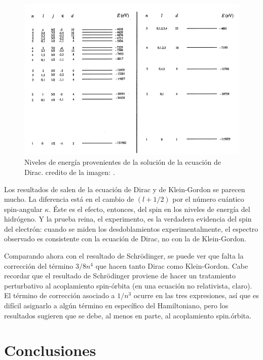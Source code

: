 \documentclass[a4paper, 12pt]{article} %
\begin{document}
\begin{figure}[H]
\centering
\includegraphics[scale=0.5]{relativistic.png}
\caption{Niveles de energ\'ia provenientes de la soluci\'on de la ecuaci\'on de Dirac.
credito de la imagen: \cite{strange}.}
\label{fig:relativistic}
\end{figure}

Los resultados de salen de la ecuaci\'on de Dirac y de Klein-Gordon se parecen mucho. La diferencia est\'a en el cambio de $(l+1/2)$ por el n\'umero cu\'antico spin-angular $\kappa$. \'Este es el efecto, entonces, del spin en los niveles de energ\'ia del hidr\'ogeno. Y la prueba reina, el experimento, es la verdadera evidencia del spin del electr\'on: cuando se miden los desdoblamientos experimentalmente, el espectro observado es consistente con la ecuaci\'on de Dirac, no con la de Klein-Gordon.

Comparando ahora con el resultado de Schr\"odinger, se puede ver que falta la correcci\'on del t\'ermino $3/8n^4$ que hacen tanto Dirac como Klein-Gordon. Cabe recordar que el resultado de Schr\"odinger proviene de hacer un tratamiento perturbativo al acoplamiento spin-\'orbita (en una ecuaci\'on no relativista, claro). El t\'ermino de correcci\'on asociado a $1/n^3$ ocurre en las tres expresiones, as\'i que es dif\'icil asignarlo a alg\'un t\'ermino en espec\'ifico del Hamiltoniano, pero los resultados sugieren que se debe, al menos en parte, al acoplamiento spin.\'orbita.

\section{Conclusiones}
\end{document}

